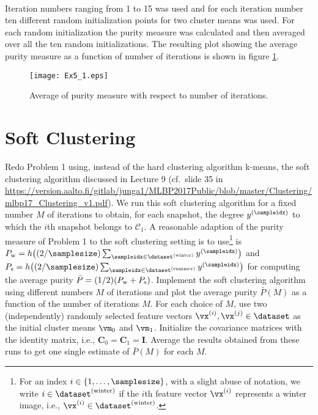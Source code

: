 \documentclass[article,11pt]{article}
\newcommand{\cluster}{\mathcal{C}}
\begin{document}
\\
Iteration numbers ranging from 1 to 15 was used and for each
iteration number ten different random initialization points for two
cluster means was used. For each random initialization the purity
measure was calculated and then averaged over all the ten random
initializations. The resulting plot showing the average purity
measure as a function of number of iterations is shown in figure
\ref{fig:plot1}.
\begin{figure}[!h]
  \centering
  \texttt{[image: Ex5\_1.eps]}
  \caption{Average of purity measure with respect to number of
    iterations.}
  \label{fig:plot1}
\end{figure}

\newpage

\section{Soft Clustering}
Redo Problem 1 using, instead of the hard clustering algorithm k-means, 
the soft clustering algorithm discussed in Lecture 9 (cf.\ slide 35 in \url{https://version.aalto.fi/gitlab/junga1/MLBP2017Public/blob/master/Clustering/mlbp17_Clustering_v1.pdf}). 
We run this soft clustering algorithm for a fixed number $M$ of iterations to obtain, for each 
snapshot, the degree $y^{(\sampleidx)}$ to which the $i$th snapshot belongs to $\cluster_{1}$.  
A reasonable adaption of the purity measure of Problem 1 to the soft clustering setting is to use\footnote{For an index $i \in \{1,\ldots,\samplesize\}$, with a slight abuse of notation, 
we write $i \in \dataset^{(\rm winter)}$ if the $i$th feature vector $\vx^{(i)}$ represents 
a winter image, i.e., $\vx^{(i)} \in \dataset^{(\rm winter)}$.} is  $P_{\rm w}= h \big( (2/\samplesize) \sum_{\sampleidx \in \dataset^{(\rm winter)}} y^{(\sampleidx)} \big)$ and 
$P_{\rm s}= h \big( (2/\samplesize) \sum_{\sampleidx \in \dataset^{(\rm summer)}} y^{(\sampleidx)} \big)$ for computing the average purity $\bar{P} = (1/2) ( P_{\rm w} +  P_{\rm s} )$.  Implement the soft clustering algorithm 
using different numbers $M$ of iterations and plot the average purity $\bar{P}(M)$ as a function of the number of iterations $M$. 
For each choice of $M$, use two (independently) randomly selected feature vectors $\vx^{(i)}, \vx^{(j)} \in \dataset$ 
as the initial cluster means $\vm_{0}$ and $\vm_{1}$. Initialize the covariance matrices with the identity matrix, i.e., $\mathbf{C}_{0} = \mathbf{C}_{1} = \mathbf{I}$. 
Average the results obtained from these runs to get one single estimate of $\bar{P}(M)$ for each $M$. 
\end{document}

